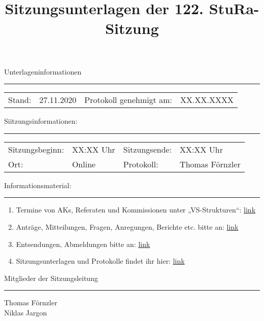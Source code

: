 \title{Sitzungsunterlagen der 122. StuRa-Sitzung}
\date{\vspace{-2em}\datum\vspace{-1em}} %
\maketitle

Unterlageninformationen
\vspace{.5em}\hrule
\begin{center}
    \begin{tabular}{m{2cm}m{3cm}m{4cm}m{3cm}}
        Stand: & 27.11.2020 & Protokoll genehmigt am: & XX.XX.XXXX\\
    \end{tabular}
\end{center}

Siitzungsinformationen:
\vspace{.5em}\hrule
\begin{center}
    \begin{tabular}{m{3cm}m{3cm}m{3cm}m{3cm}}
        Sitzungsbeginn: & XX:XX Uhr & Sitzungsende: & XX:XX Uhr\\
        Ort: & Online & Protokoll: & Thomas Förnzler \\
    \end{tabular}
\end{center}

Informationsmaterial:
\vspace{.5em}\hrule\vspace{.5em}
\begin{enumerate}
    \item Termine von AKs, Referaten und Kommissionen unter „VS-Strukturen“: \href{https://www.stura.uni-heidelberg.de}{link}
    \item Anträge, Mitteilungen, Fragen, Anregungen, Berichte etc. bitte an: \href{mailto:sitzungsleitung@stura.uni-heidelberg.de}{link}
    \item Entsendungen, Abmeldungen bitte an: \href{mailto:entsendung@stura.uni-heidelberg.de}{link}
    \item Sitzungsunterlagen und Protokolle findet ihr hier: \href{https://www.stura.uni-heidelberg.de/vs-strukturen/studierendenrat/protokolle-antraege-beschluesse-der-8-legislatur/}{link}
\end{enumerate}
\vspace{1.5em}

Mitglieder der Sitzungsleitung
\vspace{.5em}\hrule\vspace{.5em}
Thomas Förnzler\\
Niklas Jargon
\pagebreak 